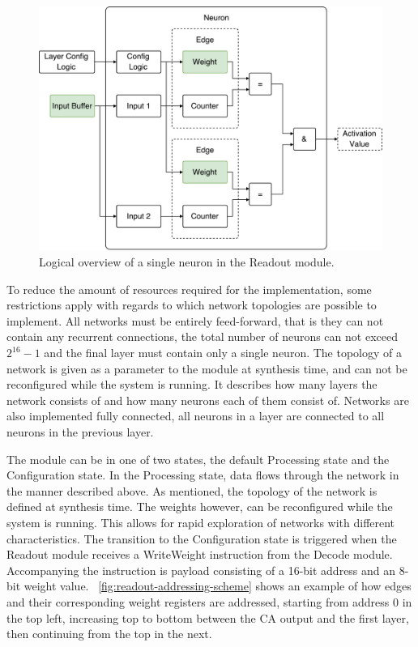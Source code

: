 \begin{figure}[ht]
  \centering
  \includegraphics[width=0.8\linewidth]{fig/readout-neuron}
  \caption{Logical overview of a single neuron in the Readout module.}
  \label{fig:readout-neuron}
\end{figure}

To reduce the amount of resources required for the implementation, some
restrictions apply with regards to which network topologies are possible to
implement. All networks must be entirely feed-forward, that is they can not
contain any recurrent connections, the total number of neurons can not exceed
$2^{16}-1$ and the final layer must contain only a single neuron. The topology
of a network is given as a parameter to the module at synthesis time, and can
not be reconfigured while the system is running. It describes how many layers
the network consists of and how many neurons each of them consist of. Networks
are also implemented fully connected, all neurons in a layer are connected to
all neurons in the previous layer.

The module can be in one of two states, the default Processing state and the
Configuration state. In the Processing state, data flows through the network in
the manner described above. As mentioned, the topology of the network is defined
at synthesis time. The weights however, can be reconfigured while the system is
running. This allows for rapid exploration of networks with different
characteristics. The transition to the Configuration state is triggered when the
Readout module receives a WriteWeight instruction from the Decode module.
Accompanying the instruction is payload consisting of a 16-bit address and an
8-bit weight value. \figurename~\ref{fig:readout-addressing-scheme} shows an
example of how edges and their corresponding weight registers are addressed,
starting from address 0 in the top left, increasing top to bottom between the CA
output and the first layer, then continuing from the top in the next.

